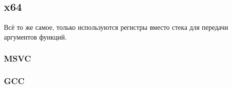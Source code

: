 \subsection{x64}

Всё то же самое, только используются регистры вместо стека для передачи аргументов функций.

\subsubsection{MSVC}



\ifdefined\IncludeGCC
\subsubsection{GCC}


\fi
